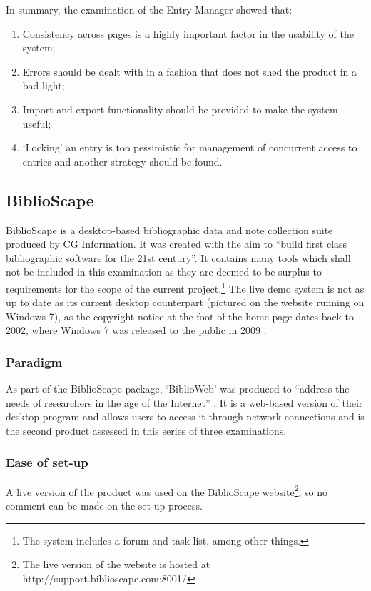 In summary, the examination of the \bibtex{} Entry Manager showed that:
\begin{enumerate}
	\item Consistency across pages is a highly important factor in the usability of the system; 
	\item Errors should be dealt with in a fashion that does not shed the product in a bad light;
	\item Import and export functionality should be provided to make the system useful;
	\item `Locking' an entry is too pessimistic for management of concurrent access to entries and another strategy should be found.
\end{enumerate} 


\subsection{BiblioScape}
BiblioScape is a desktop-based bibliographic data and note collection suite produced by CG Information.  It was created with the aim to ``build first class bibliographic software for the 21st century''.  It contains many tools which shall not be included in this examination as they are deemed to be surplus to requirements for the scope of the current project.\footnote{The system includes a forum and task list, among other things.} The live demo system is not as up to date as its current desktop counterpart (pictured on the website running on Windows 7), as the copyright notice at the foot of the home page dates back to 2002, where Windows 7 was released to the public in 2009 \cite{Win7Release}.

\subsubsection{Paradigm}
As part of the BiblioScape package, `BiblioWeb' was produced to ``address the needs of researchers in the age of the Internet'' \cite{BiblioWebWhy}.  It is a web-based version of their desktop program and allows users to access it through network connections and is the second product assessed in this series of three examinations.

\subsubsection{Ease of set-up}
A live version of the product was used on the BiblioScape website\footnote{The live version of the website is hosted at http://support.biblioscape.com:8001/}, so no comment can be made on the set-up process.

